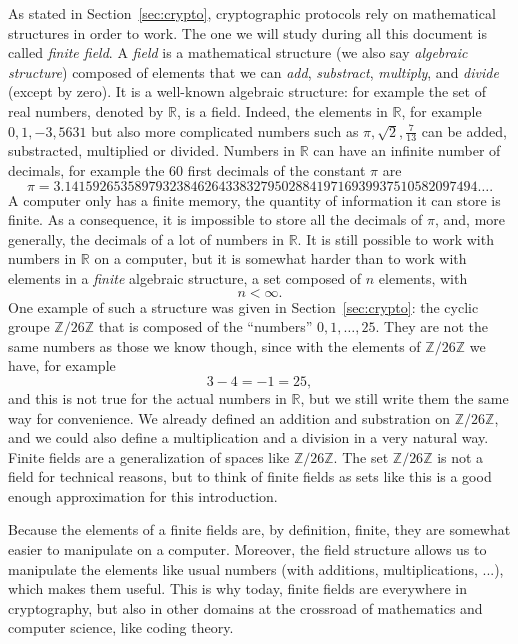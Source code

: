 As stated in Section~\ref{sec:crypto}, cryptographic protocols rely on
mathematical structures in order to work. The one we will study during all this
document is called \emph{finite field}. A \emph{field} is a mathematical
structure (we also say \emph{algebraic structure}) composed of elements that we
can \emph{add}, \emph{substract}, \emph{multiply}, and \emph{divide} (except by
zero). It is a well-known algebraic structure: for example the set of real
numbers, denoted by $\mathbb{R}$, is a field. Indeed, the elements in
$\mathbb{R}$, for example $0, 1, -3, 5631$ but also more complicated numbers
such as $\pi, \sqrt 2, \frac{7}{13}$ can be added, substracted, multiplied or
divided. Numbers in $\mathbb{R}$ can have an infinite number of decimals, for
example the $60$ first decimals of the constant $\pi$ are
\[
  \pi = 3.14159265358979323846264338327950288419716939937510582097494\dots.
\]
A computer only has a finite memory, \ie the quantity of information it can
store is finite. As a consequence, it is impossible to store all the decimals of
$\pi$, and, more generally, the decimals of a lot of numbers in $\mathbb{R}$. It
is still possible to work with numbers in $\mathbb{R}$ on a computer, but it is
somewhat harder than to work with elements in a \emph{finite} algebraic
structure, \ie a set composed of $n$ elements, with
\[
  n < \infty.
\]
One example of such a structure was given in Section~\ref{sec:crypto}: the
cyclic groupe $\mathbb{Z}/26\mathbb{Z}$ that is composed of the ``numbers'' $0,
1, \dots, 25$. They are not the same numbers as those we know though, since with
the elements of $\mathbb{Z}/26\mathbb{Z}$ we have, for example
\[
  3 - 4 = -1 = 25,
\]
and this is not true for the actual numbers in $\mathbb{R}$, but we still write
them the same way for convenience. We already defined an
addition and substration on $\mathbb{Z}/26\mathbb{Z}$, and we could also define
a multiplication and a division in a very natural way. Finite fields are a
generalization of spaces like
$\mathbb{Z}/26\mathbb{Z}$. The set $\mathbb{Z}/26\mathbb{Z}$ is not a field for
technical reasons, but to think of finite fields as sets like this is a good
enough approximation for this introduction.

Because the elements of a finite fields are, by definition, finite, they are
somewhat easier to manipulate on a computer. Moreover, the field structure
allows us to manipulate the elements like usual numbers (\ie with additions,
multiplications, ...), which makes them useful. This is why today, finite fields
are everywhere in cryptography, but also in other domains at the crossroad of
mathematics and computer science, like coding theory.

